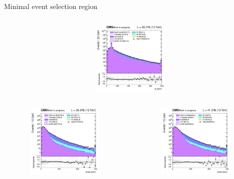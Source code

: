 \documentclass[8pt]{beamer}
\begin{document}
\begin{frame}{Minimal event selection region}
\begin{columns}
\begin{column}{0.33\textwidth}
\begin{center}
			\vspace{-8pt}
			\begin{block}{}\end{block}\vspace{10pt}
     			\includegraphics[width=1.0\textwidth, height=100pt]{figs/2018/log_cratio_inclusiveCR_ll_mll.png}
    		\end{center}		
		\end{column}
\end{columns}
\vspace{-5pt}
\begin{columns}
		\begin{column}{0.33\textwidth}
			\begin{center}
     			\includegraphics[width=1.0\textwidth, height=100pt]{figs/2016/log_cratio_inclusiveCR_ll_METcorrected_pt.png}
    		\end{center}		
		\end{column}
		\begin{column}{0.33\textwidth}
			\begin{center}
     			\includegraphics[width=1.0\textwidth, height=100pt]{figs/2017/log_cratio_inclusiveCR_ll_METcorrected_pt.png}

\end{center}
\end{column}
\end{columns}
\end{frame}
\end{document}

